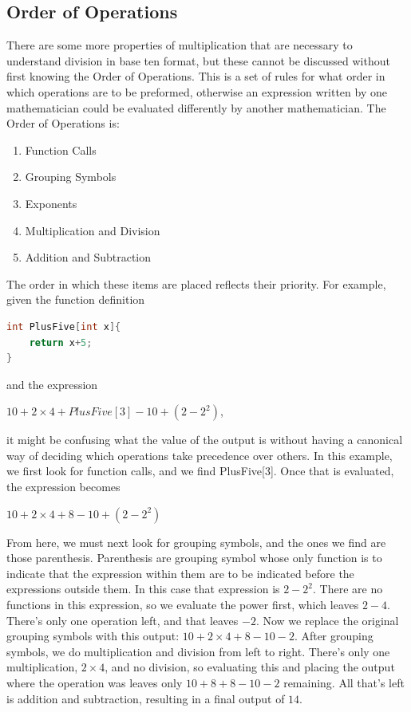 \subsection{Order of Operations}
There are some more properties of multiplication that are necessary to understand division in base ten format, but these cannot be discussed without first knowing the Order of Operations. This is a set of rules for what order in which operations are to be preformed, otherwise an expression written by one mathematician could be evaluated differently by another mathematician. The Order of Operations is:
\begin{center}
\begin{enumerate}
	\label{enum:OrderOps}
	\item{Function Calls}
	\item{Grouping Symbols}
	\item{Exponents}
	\item{Multiplication and Division}
	\item{Addition and Subtraction}
\end{enumerate}
\end{center}
The order in which these items are placed reflects their priority. For example, given the function definition
\begin{center}
\begin{lstlisting}[language=C,caption=PlusFive Example Function,label=lst:pls5Func,mathescape]
int PlusFive[int x]{
	return x+5;
}
\end{lstlisting}
\end{center}
and the expression 
\begin{center}
$10 + 2 \times 4 + PlusFive[3]-10+(2-2^2)$,
\end{center}
 it might be confusing what the value of the output is without having a canonical way of deciding which operations take precedence over others. In this example, we first look for function calls, and we find PlusFive[3]. Once that is evaluated, the expression becomes 
 \begin{center}
 $10+2\times 4+ 8 -10+(2-2^2)$
 \end{center}
From here, we must next look for grouping symbols, and the ones we find are those parenthesis. Parenthesis are grouping symbol whose only function is to indicate that the expression within them are to be indicated before the expressions outside them. In this case that expression is $2-2^2$. There are no functions in this expression, so we evaluate the power first, which leaves $2-4$. There's only one operation left, and that leaves $-2$. Now we replace the original grouping symbols with this output: $10+2\times 4+8-10-2$. After grouping symbols, we do multiplication and division from left to right. There's only one multiplication, $2\times 4$, and no division, so evaluating this and placing the output where the operation was leaves only $10+8+8-10-2$ remaining. All that's left is addition and subtraction, resulting in a final output of $14$.

